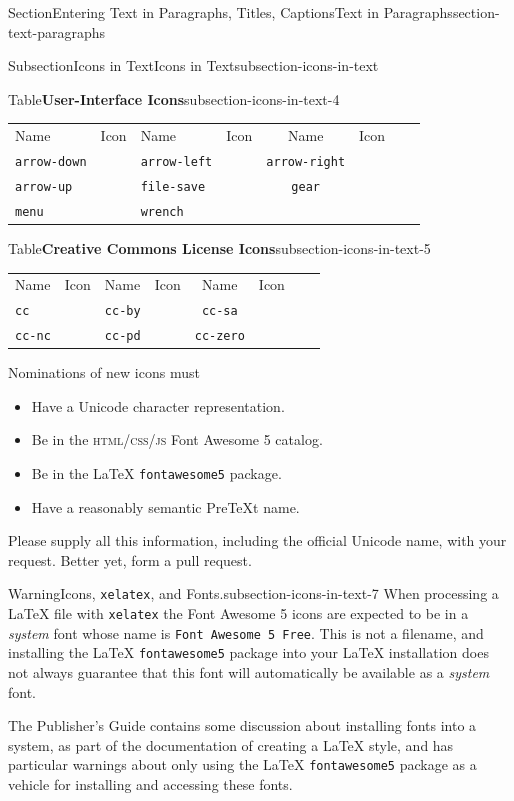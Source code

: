 \documentclass[twoside,10pt,]{article}
\newcommand{\tabularfont}{\relax}
\newcommand{\mono}[1]{\texttt{#1}}
\newcommand{\initialism}[1]{\textsc{\MakeLowercase{#1}}}
\numberwithin{equation}{section}
\newcommand{\hrulemedium}{\noalign{\hrule height 0.07em}}
\begin{document}
\begin{sectionptx}{Section}{Entering Text in Paragraphs, Titles, Captions}{}{Text in Paragraphs}{}{}{section-text-paragraphs}
\begin{subsectionptx}{Subsection}{Icons in Text}{}{Icons in Text}{}{}{subsection-icons-in-text}
\begin{tableptx}{Table}{\textbf{User-Interface Icons}}{subsection-icons-in-text-4}{}
\centering%
{\tabularfont%
\begin{tabular}{lcBlcBlc}
Name&Icon&Name&Icon&Name&Icon\tabularnewline\hrulemedium
\mono{arrow-down}&\faArrowDown{}&\mono{arrow-left}&\faArrowLeft{}&\mono{arrow-right}&\faArrowRight{}\tabularnewline[0pt]
\mono{arrow-up}&\faArrowUp{}&\mono{file-save}&\faSave{}&\mono{gear}&\faCog{}\tabularnewline[0pt]
\mono{menu}&\faBars{}&\mono{wrench}&\faWrench{}&&
\end{tabular}
}%
\end{tableptx}%
\begin{tableptx}{Table}{\textbf{Creative Commons License Icons}}{subsection-icons-in-text-5}{}%
\centering%
{\tabularfont%
\begin{tabular}{lcBlcBlc}
Name&Icon&Name&Icon&Name&Icon\tabularnewline\hrulemedium
\mono{cc}&\faCreativeCommons{}&\mono{cc-by}&\faCreativeCommonsBy{}&\mono{cc-sa}&\faCreativeCommonsSa{}\tabularnewline[0pt]
\mono{cc-nc}&\faCreativeCommonsNc{}&\mono{cc-pd}&\faCreativeCommonsPd{}&\mono{cc-zero}&\faCreativeCommonsZero{}
\end{tabular}
}%
\end{tableptx}%
Nominations of new icons must%
\begin{itemize}[label=\textbullet]
\item{}Have a Unicode character representation.%
\item{}Be in the \initialism{HTML\slash{}CSS\slash{}JS} Font Awesome 5 catalog.%
\item{}Be in the \LaTeX{} \mono{fontawesome5} package.%
\item{}Have a reasonably semantic PreTeXt name.%
\end{itemize}
Please supply all this information, including the official Unicode name, with your request.  Better yet, form a pull request.%
\begin{warning}{Warning}{Icons, \mono{xelatex}, and Fonts.}{subsection-icons-in-text-7}%
When processing a \LaTeX{} file with \mono{xelatex} the Font Awesome 5 icons are expected to be in a \emph{system} font whose name is \mono{Font Awesome 5 Free}.  This is not a filename, and installing the \LaTeX{} \mono{fontawesome5} package into your \LaTeX{} installation does not always guarantee that this font will automatically be available as a \emph{system} font.%
\par
The Publisher's Guide contains some discussion about installing fonts into a system, as part of the documentation of creating a \LaTeX{} style, and has particular warnings about only using the \LaTeX{} \mono{fontawesome5} package as a vehicle for installing and accessing these fonts.%

\end{warning}
\end{subsectionptx}
\end{sectionptx}
\end{document}
